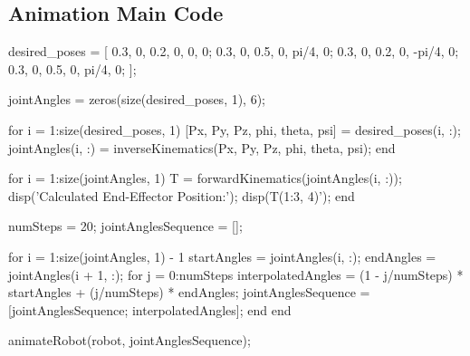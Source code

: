 \documentclass[conference]{IEEEtran}
\begin{document}
\subsection{Animation Main Code}
\label{appendix:AnimateMain}
\begin{matlabcode}[label={AnimateMainAppendix}]
desired_poses = [
    0.3, 0, 0.2, 0, 0, 0;      %
    0.3, 0, 0.5, 0, pi/4, 0;   %
    0.3, 0, 0.2, 0, -pi/4, 0;  %
    0.3, 0, 0.5, 0, pi/4, 0;   %
];

jointAngles = zeros(size(desired_poses, 1), 6);

for i = 1:size(desired_poses, 1)
    [Px, Py, Pz, phi, theta, psi] = desired_poses(i, :);
    jointAngles(i, :) = inverseKinematics(Px, Py, Pz, phi, theta, psi);
end

for i = 1:size(jointAngles, 1)
    T = forwardKinematics(jointAngles(i, :));
    disp('Calculated End-Effector Position:');
    disp(T(1:3, 4)');  %
end

numSteps = 20;
jointAnglesSequence = [];

for i = 1:size(jointAngles, 1) - 1
    startAngles = jointAngles(i, :);
    endAngles = jointAngles(i + 1, :);
    for j = 0:numSteps
        interpolatedAngles = (1 - j/numSteps) * startAngles + (j/numSteps) * endAngles;
        jointAnglesSequence = [jointAnglesSequence; interpolatedAngles];
    end
end

animateRobot(robot, jointAnglesSequence);
\end{matlabcode}
\end{document}
